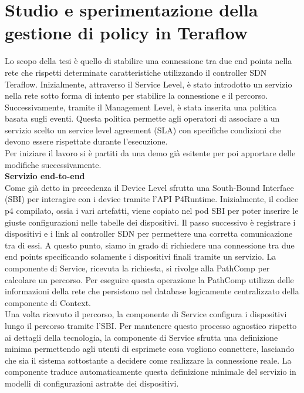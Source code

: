 \chapter{Studio e sperimentazione della gestione di policy in Teraflow}
\label{cap:policy}
Lo scopo della tesi è quello di stabilire una connessione tra due end points nella rete che rispetti determinate caratteristiche utilizzando il controller SDN Teraflow.
Inizialmente, attraverso il Service Level, è stato introdotto un servizio nella rete sotto forma di intento per stabilire la connessione e il percorso. 
Successivamente, tramite il Management Level, è stata inserita una politica basata sugli eventi. Questa politica permette agli operatori 
di associare a un servizio scelto un service level agreement (SLA) con specifiche condizioni che devono essere rispettate durante l'esecuzione.
\\Per iniziare il lavoro si è partiti da una demo già esitente per poi apportare delle modifiche successivamente.
\\\textbf{Servizio end-to-end}
\\Come già detto in precedenza il Device Level sfrutta una South-Bound Interface (SBI) per interagire con i device tramite l'API P4Runtime. 
Inizialmente, il codice p4 compilato, ossia i vari artefatti, viene copiato nel pod SBI per poter inserire le giuste configurazioni nelle tabelle dei dispositivi.
Il passo successivo è registrare i dispositivi e i link al controller SDN per permettere una corretta comunicazione tra di essi.
A questo punto, siamo in grado di richiedere una connessione tra due end points specificando solamente i dispositivi finali tramite un servizio.
La componente di Service, ricevuta la richiesta, si rivolge alla PathComp per calcolare un percorso.
Per eseguire questa operazione la PathComp utilizza delle informazioni della rete che persistono nel database logicamente centralizzato della componente di Context.
\\Una volta ricevuto il percorso, la componente di Service configura i dispositivi lungo il percorso tramite l'SBI.
Per mantenere questo processo agnostico rispetto ai dettagli della tecnologia, la componente di Service 
sfrutta una definizione minima permettendo agli utenti di esprimete cosa vogliono connettere, lasciando che sia il sistema sottostante a decidere come realizzare la connessione reale.
La componente traduce automaticamente questa definizione minimale del servizio in modelli di configurazioni astratte dei dispositivi. 
